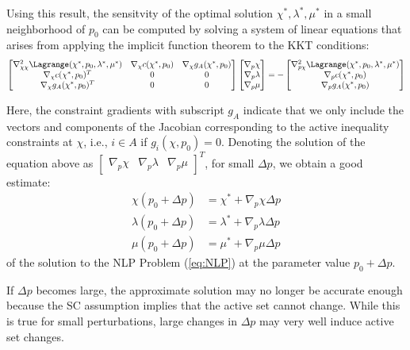 \documentclass{article}
\theoremstyle{example}
\theoremstyle{definition}
\theoremstyle{assumption}
\theoremstyle{lemma}
\begin{document}
	\par
	Using this result, the sensitvity of the optimal solution $\chi^*,\lambda^*,\mu^*$ in a small neighborhood of $p_0$ can be computed by solving a system of linear equations that arises from applying the implicit function theorem to the KKT conditions:
	\begin{equation}
		\begin{bmatrix}
			\nabla_{\chi\chi}^2\Lagrange(\chi^*,p_0,\lambda^*,\mu^*)&\nabla_\chi c(\chi^*,p_0)&\nabla_\chi g_A(\chi^*,p_0)\\
			\nabla_\chi c(\chi^*,p_0)^T & 0 & 0\\
			\nabla_\chi g_A(\chi^*,p_0)^T & 0 & 0
		\end{bmatrix}
		\begin{bmatrix}
			\nabla_p\chi\\
			\nabla_p\lambda\\
			\nabla_p\mu
		\end{bmatrix}
		=-
		\begin{bmatrix}
			\nabla_{p\chi}^2\Lagrange(\chi^*,p_0,\lambda^*,\mu^*)\\
			\nabla_p c(\chi^*,p_0)\\
			\nabla_p g_A(\chi^*,p_0)
		\end{bmatrix}
		\label{eq:NLP_KKT}
	\end{equation}
	\par
	Here, the constraint gradients with subscript $g_A$ indicate that we only include the vectors and components of the Jacobian corresponding to the active inequality constraints at $\chi$, i.e., $i\in A$ if $g_i(\chi,p_0)=0$.
	Denoting the solution of the equation above as $\begin{bmatrix}\nabla_p\chi & \nabla_p\lambda & \nabla_p\mu\end{bmatrix}^T$, for small $\Delta p$, we obtain a good estimate:
	\begin{align}
		\chi(p_0+\Delta p)&=\chi^*+\nabla_p\chi\Delta p\\
		\lambda(p_0+\Delta p)&=\lambda^*+\nabla_p\lambda\Delta p\\
		\mu(p_0+\Delta p)&=\mu^*+\nabla_p\mu\Delta p
	\end{align}
	of the solution to the NLP Problem (\ref{eq:NLP}) at the parameter value $p_0+\Delta p$.
	\par
	If $\Delta p$ becomes large, the approximate solution may no longer be accurate enough because the SC assumption implies that the active set cannot change. 
	While this is true for small perturbations, large changes in $\Delta p$ may very well induce active set changes.
\end{document}

